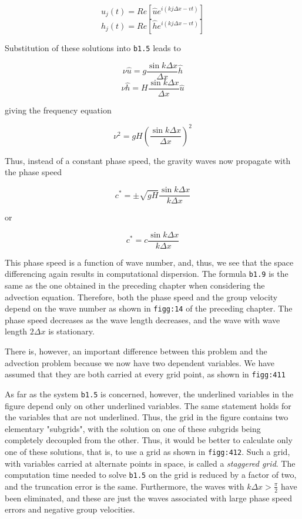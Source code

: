 \[u_{j}\left( t \right) = Re\left\lbrack \widehat{u}e^{i\left( kj\Delta x - vt \right)} \right\rbrack\]\[h_{j}\left( t \right) = Re\left\lbrack \widehat{h}e^{i\left( kj\Delta x - vt \right)} \right\rbrack\]

Substitution of these solutions into \texttt{b1.5} leads to

\[\nu\widehat{u} = g\frac{\sin{k\Delta x}}{\Delta x}\widehat{h}\]\[\nu\widehat{h} = H\frac{\sin{k\Delta x}}{\Delta x}\widehat{u}\]

giving the frequency equation

\[\nu^{2} = gH\left( \frac{\sin{k\Delta x}}{\Delta x} \right)^{2}\]

Thus, instead of a constant phase speed, the gravity waves now propagate
with the phase speed

\[c^{*} = \pm \sqrt{gH}\frac{\sin{k\Delta x}}{k \Delta x}\]

or

\[c^{*} = c \frac{\sin{k\Delta x}}{k\Delta x}\]

This phase speed is a function of wave number, and, thus, we see that
the space differencing again results in computational dispersion. The
formula \texttt{b1.9} is the same as the one obtained in the preceding
chapter when considering the advection equation. Therefore, both the
phase speed and the group velocity depend on the wave number as shown in
\texttt{figg:14} of the preceding chapter. The phase speed decreases as
the wave length decreases, and the wave with wave length \(2\Delta x\)
is stationary.

There is, however, an important difference between this problem and the
advection problem because we now have two dependent variables. We have
assumed that they are both carried at every grid point, as shown in
\texttt{figg:411}

\begin{figure}
\centering
{}
\caption{}
\end{figure}

As far as the system \texttt{b1.5} is concerned, however, the underlined
variables in the figure depend only on other underlined variables. The
same statement holds for the variables that are not underlined. Thus,
the grid in the figure contains two elementary "subgrids", with the
solution on one of these subgrids being completely decoupled from the
other. Thus, it would be better to calculate only one of these
solutions, that is, to use a grid as shown in \texttt{figg:412}. Such a
grid, with variables carried at alternate points in space, is called a
\emph{staggered grid}. The computation time needed to solve
\texttt{b1.5} on the grid is reduced by a factor of two, and the
truncation error is the same. Furthermore, the waves with
\(k\Delta x > \frac{\pi}{2}\) have been eliminated, and these are just
the waves associated with large phase speed errors and negative group
velocities.

